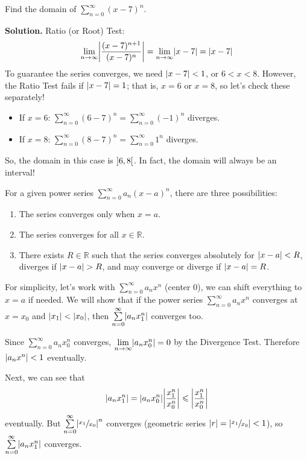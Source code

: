 \begin{Example}{}{}
    Find the domain of $ \displaystyle \sum\limits_{n=0}^{\infty} (x-7)^n $.

    \textbf{Solution.} Ratio (or Root) Test:
    \[ \lim\limits_{{n} \to {\infty}} \abs*{\frac{(x-7)^{n+1}}{(x-7)^n}}
        =\lim\limits_{{n} \to {\infty}} \abs{x-7}
        =\abs{x-7} \]
    To guarantee the series converges, we need $ \abs{x-7}<1 $,
    or $ 6<x<8 $. However, the Ratio Test fails if $ \abs{x-7}=1 $; that is,
    $ x=6 $ or $ x=8 $, so let's check these separately!
    \begin{itemize}
        \item If $ x=6 $: $ \sum\limits_{n=0}^{\infty} (6-7)^n=\sum\limits_{n=0}^{\infty} (-1)^n $
              diverges.
        \item If $ x=8 $: $ \sum\limits_{n=0}^{\infty} (8-7)^n=\sum\limits_{n=0}^{\infty}1^n $
              diverges.
    \end{itemize}
    So, the domain in this case is $ \interval[open]{6}{8} $.
    In fact, the domain will always be an interval!
\end{Example}

\begin{Theorem}{}{}
    For a given power series $ \sum\limits_{n=0}^{\infty} a_n(x-a)^n $, there are
    three possibilities:
    \begin{enumerate}
        \item The series converges only when $ x=a $.
        \item The series converges for all $ x\in\mathbb{R} $.
        \item There exists $ R\in\mathbb{R} $ such that the series converges
              absolutely for $ \abs{x-a}<R $, diverges if $ \abs{x-a}>R $, and may converge
              or diverge if $ \abs{x-a}=R $.
    \end{enumerate}
\end{Theorem}

\begin{Proof}{}{}
    For simplicity, let's work with $ \sum\limits_{n=0}^{\infty} a_n x^n $ (center 0),
    we can shift everything to $ x=a $ if needed. We will show that if the power series
    $ \sum\limits_{n=0}^{\infty} a_n x^n $ converges at $ x=x_0 $ and $ \abs{x_1}<\abs{x_0} $,
    then $ \sum\limits_{n=0}^{\infty} \abs*{a_n x_1^n} $ converges too.

    Since
    $ \sum\limits_{n=0}^{\infty} a_n x_0^n $ converges, $ \lim\limits_{{n} \to {\infty}}
        \abs*{a_n x_0^n}=0 $ by the Divergence Test. Therefore $ \abs{a_n x^n}<1 $ eventually.

    Next, we can see that
    \[ \abs*{a_n x_1^n}=\abs*{a_n x_0^n}\abs*{\frac{x_1^n}{x_0^n}}\leqslant \abs*{\frac{x_1^n}{x_0^n}} \]
    eventually. But $ \sum\limits_{n=0}^{\infty} \abs*{\sfrac{x_1}{x_0}}^n $ converges
    (geometric series $ \abs{r}=\abs*{\sfrac{x_1}{x_0}}<1 $), so $ \sum\limits_{n=0}^{\infty}
        \abs{a_n x_1^n} $
    converges.
\end{Proof}

